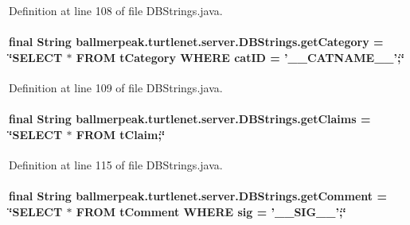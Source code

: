 Definition at line 108 of file D\-B\-Strings.\-java.

\hypertarget{classballmerpeak_1_1turtlenet_1_1server_1_1DBStrings_aefd36226bfa1c2c3f5b7cfd7a88c8ea6}{
\paragraph[{get\-Category}]{\setlength{\rightskip}{0pt plus 5cm}final String ballmerpeak.\-turtlenet.\-server.\-D\-B\-Strings.\-get\-Category = \char`\"{}S\-E\-L\-E\-C\-T $\ast$ F\-R\-O\-M t\-Category W\-H\-E\-R\-E cat\-I\-D = '\-\_\-\-\_\-\-C\-A\-T\-N\-A\-M\-E\-\_\-\-\_\-';\char`\"{}\hspace{0.3cm}{\ttfamily [static]}}}\label{classballmerpeak_1_1turtlenet_1_1server_1_1DBStrings_aefd36226bfa1c2c3f5b7cfd7a88c8ea6}


Definition at line 109 of file D\-B\-Strings.\-java.

\hypertarget{classballmerpeak_1_1turtlenet_1_1server_1_1DBStrings_a18809032ae6a521a9293b4f4e8cfa5f4}{
\paragraph[{get\-Claims}]{\setlength{\rightskip}{0pt plus 5cm}final String ballmerpeak.\-turtlenet.\-server.\-D\-B\-Strings.\-get\-Claims = \char`\"{}S\-E\-L\-E\-C\-T $\ast$ F\-R\-O\-M t\-Claim;\char`\"{}\hspace{0.3cm}{\ttfamily [static]}}}\label{classballmerpeak_1_1turtlenet_1_1server_1_1DBStrings_a18809032ae6a521a9293b4f4e8cfa5f4}


Definition at line 115 of file D\-B\-Strings.\-java.

\hypertarget{classballmerpeak_1_1turtlenet_1_1server_1_1DBStrings_a5584702225a961d74dc35ee4660c136e}{
\paragraph[{get\-Comment}]{\setlength{\rightskip}{0pt plus 5cm}final String ballmerpeak.\-turtlenet.\-server.\-D\-B\-Strings.\-get\-Comment = \char`\"{}S\-E\-L\-E\-C\-T $\ast$ F\-R\-O\-M t\-Comment W\-H\-E\-R\-E sig = '\-\_\-\-\_\-\-S\-I\-G\-\_\-\-\_\-';\char`\"{}\hspace{0.3cm}{\ttfamily [static]}}}\label{classballmerpeak_1_1turtlenet_1_1server_1_1DBStrings_a5584702225a961d74dc35ee4660c136e}


